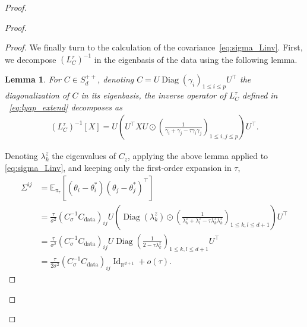 \documentclass[11pt]{article}
\newtheorem{lem}{Lemma}
\newcommand{\id}{\operatorname{Id}}
\newcommand{\RR}{\mathbb{R}}
\newcommand{\EE}{\mathbb{E}}
\newcommand{\diag}[1]{\operatorname{Diag}\left({#1}\right)}
\begin{document}
\begin{proof}
\begin{proof}
\begin{proof}
We finally turn to the calculation of the covariance~\eqref{eq:sigma_Linv}. First, we decompose $(L_{ C}^\tau)^{-1}$ in the eigenbasis of the data using the following lemma.
%
%
\begin{lem} \label{lem:SGD_3} For $C \in S^{++}_d$, denoting $C = U \diag{\gamma_i}_{1 \leq i\leq p} U^\top$ the diagonalization of $C$ in its eigenbasis, the inverse operator of $L^\tau_C$ defined in ~\eqref{eq:lyap_extend} decomposes as 
\begin{align*}
   (L_{ C}^\tau)^{-1}[X] = U \left( U^\top X U \odot \left(\frac{1}{\gamma_i + \gamma_j - \tau \gamma_i \gamma_j}\right)_{1 \leq i,j \leq p} \right) U^\top.
\end{align*}
\end{lem}
Denoting $\lambda^z_k$ the eigenvalues of $C_z$, applying the above lemma applied to \eqref{eq:sigma_Linv}, and keeping only the first-order expansion in $\tau$,
\begin{align*}
    \Sigma^{ij} &= \EE_{\pi_\tau}\left[(\theta_i -  \theta_i^*)(\theta_j - \theta_j^*)^\top\right] \\&= \frac{\tau}{\sigma^2} \left(C_\sigma^{-1} C_\mathrm{data}\right)_{ij} U \left(\operatorname{Diag}\left(\lambda^z_k\right) \odot \left(\frac{1}{\lambda^z_k + \lambda^z_l -  \tau \lambda_k^z \lambda^z_k}\right)_{1\leq k,l\leq d+1} \right)U^\top  \\
    &= \frac{\tau}{\sigma^2} \left(C_\sigma^{-1} C_\mathrm{data}\right)_{ij} U \operatorname{Diag}\left(\frac{1}{2 - \tau\lambda^z_k}\right)_{1\leq k,l\leq d+1} U^\top \\
    &= \frac{\tau}{2 \sigma^2} \left(C_\sigma^{-1} C_\mathrm{data}\right)_{ij} \id_{\RR^{d+1}} + o(\tau) . 
\end{align*}
 

\end{proof}
\end{proof}
\end{proof}
\end{document}
